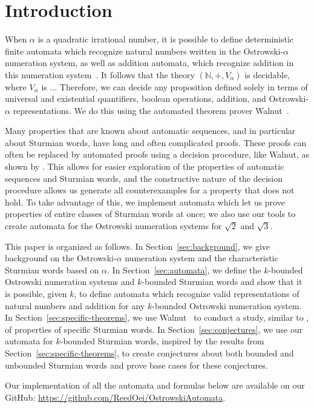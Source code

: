 \section{Introduction}

When $\alpha$ is a quadratic irrational number, it is possible to define deterministic finite automata which recognize natural numbers written in the Ostrowski-$\alpha$ numeration system, as well as addition automata, which recognize addition in this numeration system~\cite{ht-ostrowski}. It follows that the theory $(\mathbb{N}, +, V_{\alpha})$ is decidable, where $V_{\alpha}$ is ... Therefore, we can decide any proposition defined solely in terms of universal and existential quantifiers, boolean operations, addition, and Ostrowski-$\alpha$ representations. We do this using the automated theorem prover Walnut~\cite{walnut}.

Many properties that are known about automatic sequences, and in particular about Sturmian words, have long and often complicated proofs.
These proofs can often be replaced by automated proofs using a decision procedure, like Walnut, as shown by .
This allows for easier exploration of the properties of automatic sequences and Sturmian words, and  the constructive nature of the decision procedure allows us generate all counterexamples for a property that does not hold.
To take advantage of this, we implement automata which let us prove properties of entire classes of Sturmian words at once; we also use our tools to create automata for the Ostrowski numeration systems for $\sqrt{2}$ and $\sqrt{3}$.

This paper is organized as follows.
In Section~\ref{sec:background}, we give background on the Ostrowski-$\alpha$ numeration system and the characteristic Sturmian words based on $\alpha$.
In Section~\ref{sec:automata}, we define the $k$-bounded Ostrowski numeration systems and $k$-bounded Sturmian words and show that it is possible, given $k$, to define automata which recognize valid representations of natural numbers and addition for any $k$-bounded Ostrowski numeration system.
In Section~\ref{sec:specific-theorems}, we use  Walnut~\cite{walnut} to conduct a study, similar to \citeauthor{fibword}, of properties of specific Sturmian words.
In Section~\ref{sec:conjectures}, we use our automata for $k$-bounded Sturmian words, inspired by the results from Section~\ref{sec:specific-theorems}, to create conjectures about both bounded and unbounded Sturmian words and prove base cases for these conjectures.

Our implementation of all the automata and formulas below are available on our GitHub: \url{https://github.com/ReedOei/OstrowskiAutomata}.
